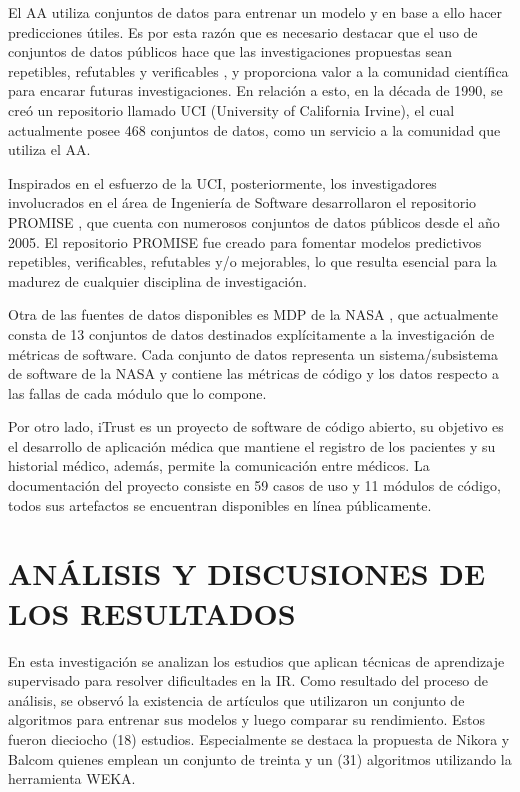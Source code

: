 \documentclass[journal]{IEEEtran}
\begin{document}
El AA utiliza conjuntos de datos para entrenar un modelo y en base a ello hacer predicciones útiles. Es por esta razón que es necesario destacar que el uso de conjuntos de datos públicos hace que las investigaciones propuestas sean repetibles, refutables y verificables \cite{Catal2009}, y proporciona valor a la comunidad científica para encarar futuras investigaciones. En relación a esto, en la década de 1990, se creó un repositorio llamado UCI  (University of California Irvine), el cual actualmente posee 468 conjuntos de datos, como un servicio a la comunidad que utiliza el AA. 

Inspirados en el esfuerzo de la UCI, posteriormente, los investigadores involucrados en el área de Ingeniería de Software desarrollaron el repositorio PROMISE , que cuenta con numerosos conjuntos de datos públicos desde el año 2005. El repositorio PROMISE fue creado para fomentar modelos predictivos repetibles, verificables, refutables y/o mejorables, lo que resulta esencial para la madurez de cualquier disciplina de investigación. 

Otra de las fuentes de datos disponibles es MDP de la NASA , que actualmente consta de 13 conjuntos de datos destinados explícitamente a la investigación de métricas de software. Cada conjunto de datos representa un sistema/subsistema de software de la NASA y contiene las métricas de código y los datos respecto a las fallas de cada módulo que lo compone.

Por otro lado, iTrust  es un proyecto de software de código abierto, su objetivo es el desarrollo de aplicación médica que mantiene el registro de los pacientes y su historial médico, además, permite la comunicación entre médicos. La documentación del proyecto consiste en 59 casos de uso y 11 módulos de código, todos sus artefactos se encuentran disponibles en línea públicamente. 

\section{ANÁLISIS Y DISCUSIONES DE LOS RESULTADOS}

En esta investigación se analizan los estudios que aplican técnicas de aprendizaje supervisado para resolver dificultades en la IR. Como resultado del proceso de análisis, se observó la existencia de artículos que utilizaron un conjunto de algoritmos para entrenar sus modelos y luego comparar su rendimiento.
Estos fueron dieciocho (18) estudios. Especialmente se destaca la propuesta de Nikora y Balcom \cite{nikora2009automated} quienes emplean un conjunto de treinta y un (31) algoritmos utilizando la herramienta WEKA.
\end{document}
